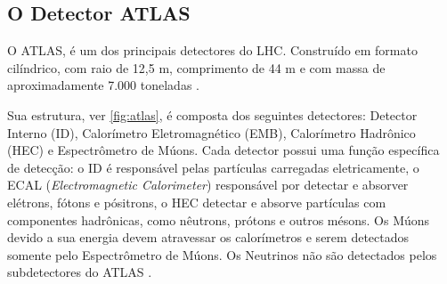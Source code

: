 \subsection{O Detector ATLAS}

 

%

O ATLAS, é um dos principais detectores do LHC. Construído em formato cilíndrico, com raio de 12,5 m, comprimento de 44 m e com massa de aproximadamente 7.000 toneladas \cite{atlas2016}.


Sua estrutura, ver \autoref{fig:atlas}, é composta dos seguintes detectores: Detector Interno (ID), Calorímetro Eletromagnético (EMB), Calorímetro Hadrônico (HEC) e Espectrômetro de Múons. Cada detector possui uma função específica de detecção: o ID é responsável pelas partículas carregadas eletricamente, o ECAL (\textit{Electromagnetic Calorimeter}) responsável por detectar e absorver elétrons, fótons e pósitrons, o HEC detectar e absorve partículas com componentes hadrônicas, como nêutrons, prótons e outros mésons. Os Múons devido a sua energia devem atravessar os calorímetros e serem detectados somente pelo Espectrômetro de Múons. Os Neutrinos não são detectados pelos subdetectores do ATLAS \cite{thesis:werner2018}.


